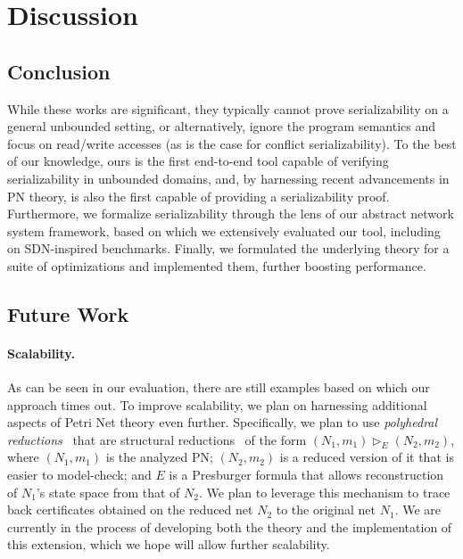 \section{Discussion}
\label{sec:discussion}

\subsection{Conclusion}

While these works are significant, they typically cannot prove serializability on a general unbounded setting, or alternatively, ignore the program semantics and focus on read/write accesses (as is the case for conflict serializability).
%
To the best of our knowledge, ours is the first end-to-end
tool capable of verifying serializability in unbounded domains, and, by harnessing recent advancements in PN theory, is also the first capable of providing a serializability proof.
%
Furthermore, we formalize serializability through the lens of our abstract network system framework, based on which we extensively evaluated our tool, including on SDN-inspired benchmarks. 
%
Finally, we formulated the underlying theory for a suite of optimizations and implemented them, further boosting performance.

%

\subsection{Future Work}

\paragraph{Scalability.}

As can be seen in our evaluation, there are still examples based on which our approach times out.
To improve scalability, we plan on harnessing additional aspects of Petri Net theory even further.
%
Specifically, we plan to use \textit{polyhedral reductions}~\cite{AmBeDa21} that are structural reductions~\cite{Be87,BeLeDa20} of the form $(N_1, m_1) \vartriangleright_E (N_2, m_2)$, where $(N_1, m_1)$ is the analyzed PN;  $(N_2, m_2)$ is a reduced version of it that is easier to model-check; and $E$ is a Presburger formula that allows reconstruction of $N_1$'s state space from that of $N_2$. We plan to leverage this mechanism to trace back certificates obtained on the reduced net $N_2$ to the original net $N_1$.
%
%
%
We are currently in the process of developing both the theory and the implementation of this extension,
which we hope will allow further scalability.

